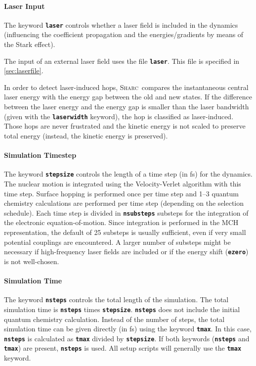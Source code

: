 \documentclass[a4paper,10pt,DIV=15,openany]{scrbook}
\newcommand{\sharc}{\textsc{Sharc}}
\newcommand{\ttt}[1]{\textbf{\texttt{#1}}}
\begin{document}
\paragraph{Laser Input}

The keyword \ttt{laser} controls whether a laser field is included in the dynamics (influencing the coefficient propagation and the energies/gradients by means of the Stark effect). 

The input of an external laser field uses the file \ttt{laser}. This file is specified in \ref{sec:laserfile}.

In order to detect laser-induced hops, \sharc\ compares the instantaneous central laser energy with the energy gap between the old and new states. If the difference between the laser energy and the energy gap is smaller than the laser bandwidth (given with the \ttt{laserwidth} keyword), the hop is classified as laser-induced. Those hops are never frustrated and the kinetic energy is not scaled to preserve total energy (instead, the kinetic energy is preserved).

\paragraph{Simulation Timestep}

The keyword \ttt{stepsize} controls the length of a time step (in fs) for the dynamics. The nuclear motion is integrated using the Velocity-Verlet algorithm with this time step. Surface hopping is performed once per time step and 1--3 quantum chemistry calculations are performed per time step (depending on the selection schedule). Each time step is divided in \ttt{nsubsteps} substeps for the integration of the electronic equation-of-motion. Since integration is performed in the MCH representation, the default of 25 substeps is usually sufficient, even if very small potential couplings are encountered. A larger number of substeps might be necessary if high-frequency laser fields are included or if the energy shift (\ttt{ezero}) is not well-chosen.

\paragraph{Simulation Time}

The keyword \ttt{nsteps} controls the total length of the simulation. The total simulation time is \ttt{nsteps} times \ttt{stepsize}. \ttt{nsteps} does not include the initial quantum chemistry calculation. Instead of the number of steps, the total simulation time can be given directly (in fs) using the keyword \ttt{tmax}. In this case, \ttt{nsteps} is calculated as \ttt{tmax} divided by \ttt{stepsize}. If both keywords (\ttt{nsteps} and \ttt{tmax}) are present, \ttt{nsteps} is used. All setup scripts will generally use the \ttt{tmax} keyword.
\end{document}
